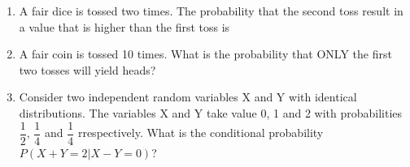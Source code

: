 \documentclass[journal,12pt,twocolumn]{IEEEtran}
\begin{document}
\begin{enumerate}
%

\item A fair dice is tossed two times. The probability that the second toss result in a value that is higher than the first toss is
\begin{enumerate}
\end{enumerate}
%
\solution

\item A fair coin is tossed 10 times. What is the probability that ONLY the first two tosses will yield heads?
\begin{enumerate}
\end{enumerate}
%
\solution

\item Consider two independent random variables X and Y with identical distributions. The variables X and Y take value 0, 1 and 2 with probabilities $\dfrac{1}{2}$, $\dfrac{1}{4}$ and $\dfrac{1}{4}$ rrespectively. What is the conditional probability $P(X+Y = 2|X-Y =0)$?


\end{enumerate}
\end{document}
